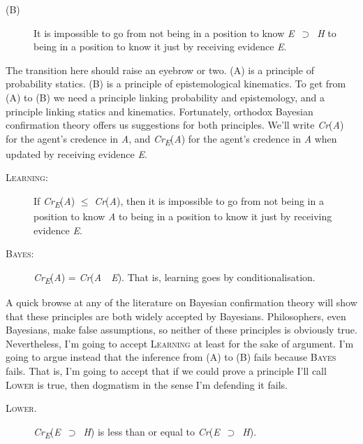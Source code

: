 \begin{description}
\item[(B)] It is impossible to go from not being in a position to know \textit{E}~${\supset}$~\textit{H} to being in a position to know it just by receiving evidence \textit{E}.
\end{description}

\noindent The transition here should raise an eyebrow or two. (A) is a principle of probability statics. (B) is a principle of epistemological kinematics. To get from (A) to (B) we need a principle linking probability and epistemology, and a principle linking statics and kinematics. Fortunately, orthodox Bayesian confirmation theory offers us suggestions for both principles. We'll write \textit{Cr}(\textit{A}) for the agent's credence in \textit{A}, and \textit{Cr}\textit{\textsubscript{E}}(\textit{A}) for the agent's credence in \textit{A} when updated by receiving evidence \textit{E}.

\begin{description}
\item[\textsc{Learning}:] If \textit{Cr}\textit{\textsubscript{E}}(\textit{A}) ${\leq}$ \textit{Cr}(\textit{A}), then it is impossible to go from not being in a position to know \textit{A} to being in a position to know it just by receiving evidence \textit{E}.
\item[\textsc{Bayes}:] \textit{Cr}\textit{\textsubscript{E}}(\textit{A}) = \textit{Cr}(\textit{A}~{\textbar}~\textit{E}). That is, learning goes by conditionalisation.
\end{description}

\noindent A quick browse at any of the literature on Bayesian confirmation theory will show that these principles are both widely accepted by Bayesians. Philosophers, even Bayesians, make false assumptions, so neither of these principles is obviously true. Nevertheless, I'm going to accept \textsc{Learning} at least for the sake of argument. I'm going to argue instead that the inference from (A) to (B) fails because \textsc{Bayes} fails. That is, I'm going to accept that if we could prove a principle I'll call \textsc{Lower} is true, then dogmatism in the sense I'm defending it fails.

\begin{description}
\item[\textsc{Lower}.] \textit{Cr}\textit{\textsubscript{E}}(\textit{E}~${\supset}$~\textit{H}) is less than or equal to \textit{Cr}(\textit{E}~${\supset}$~\textit{H}). 
\end{description}

